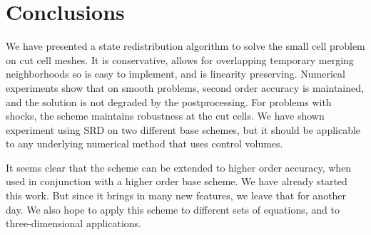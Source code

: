 \section{Conclusions}\label{sec:conc}
We have presented a  state redistribution algorithm to solve the small cell problem on cut cell meshes.  It is conservative, allows for overlapping temporary merging neighborhoods so is easy to implement, and is linearity preserving.   
Numerical experiments show that on smooth problems, second order accuracy is maintained, and the solution is not degraded by the postprocessing. For problems with shocks, the scheme maintains robustness at the cut cells.
We have shown experiment using SRD on two different base schemes, but it should be 
applicable to any underlying numerical method that uses control volumes. 

It seems clear that the scheme can be extended to higher order accuracy, when used in conjunction with a 
higher order base scheme. We have already started this work. But since it brings in many new features, we leave that for another day.  We also hope to apply this scheme to different sets of equations, and to three-dimensional applications.
